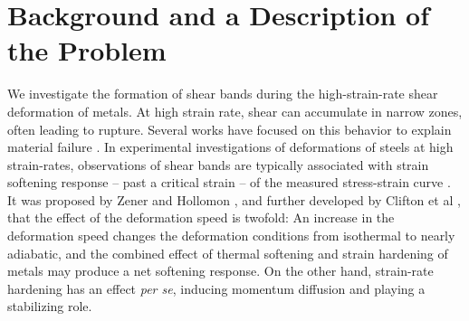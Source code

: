 \documentclass[a4paper,11pt]{article}
\numberwithin{step}{dummy}
\begin{document}
\section{Background and a Description of the Problem}
\label{sec2}
We investigate the formation of  shear bands during the high-strain-rate shear deformation of metals. 
At high strain rate, shear can accumulate  in narrow zones, often leading to rupture. 
Several works have focused on this behavior to explain material failure 
\cite{zener_effect_1944, clifton_critical_1984,  shawki_shear_1989, clifton_rev_1990, wright_survey_2002}.
In experimental investigations of deformations of steels at high strain-rates,  observations of shear bands are  typically associated 
with strain softening response -- past a critical strain -- of the measured stress-strain curve \cite{clifton_critical_1984}. 
It was proposed by Zener and Hollomon \cite{zener_effect_1944}, and further developed by Clifton et al  \cite{clifton_critical_1984, clifton_rev_1990},
that the effect of the deformation speed is twofold:
An increase in the deformation speed changes the deformation
conditions from isothermal to nearly adiabatic, and the combined effect of thermal softening and strain hardening of metals may produce 
a net softening response. On the other hand, strain-rate hardening has an effect {\it per se}, inducing momentum diffusion and playing a stabilizing role.
\end{document}
